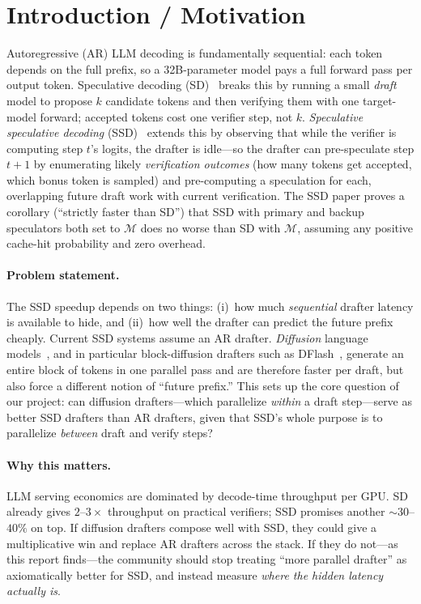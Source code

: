 \documentclass{article}
\begin{document}
\section{Introduction / Motivation}
\label{sec:intro}

Autoregressive (AR) LLM decoding is fundamentally sequential: each token depends on the full prefix, so a 32B-parameter model pays a full forward pass per output token.
Speculative decoding (SD)~\citep{leviathan2023specdec,chen2023specsampling} breaks this by running a small \emph{draft} model to propose $k$ candidate tokens and then verifying them with one target-model forward; accepted tokens cost one verifier step, not $k$.
\emph{Speculative speculative decoding} (SSD)~\citep{kumar2026ssd} extends this by observing that while the verifier is computing step $t$'s logits, the drafter is idle---so the drafter can pre-speculate step $t{+}1$ by enumerating likely \emph{verification outcomes} (how many tokens get accepted, which bonus token is sampled) and pre-computing a speculation for each, overlapping future draft work with current verification.
The SSD paper proves a corollary (``strictly faster than SD'') that SSD with primary and backup speculators both set to $\mathcal{M}$ does no worse than SD with $\mathcal{M}$, assuming any positive cache-hit probability and zero overhead.

\paragraph{Problem statement.}
The SSD speedup depends on two things: (i)~how much \emph{sequential} drafter latency is available to hide, and (ii)~how well the drafter can predict the future prefix cheaply.
Current SSD systems assume an AR drafter.
\emph{Diffusion} language models~\citep{arriola2024blockdiffusion}, and in particular block-diffusion drafters such as DFlash~\citep{dflash2025}, generate an entire block of tokens in one parallel pass and are therefore faster per draft, but also force a different notion of ``future prefix.''
This sets up the core question of our project: can diffusion drafters---which parallelize \emph{within} a draft step---serve as better SSD drafters than AR drafters, given that SSD's whole purpose is to parallelize \emph{between} draft and verify steps?

\paragraph{Why this matters.}
LLM serving economics are dominated by decode-time throughput per GPU.
SD already gives $2$--$3{\times}$ throughput on practical verifiers; SSD promises another ${\sim}30$--$40\%$ on top.
If diffusion drafters compose well with SSD, they could give a multiplicative win and replace AR drafters across the stack.
If they do not---as this report finds---the community should stop treating ``more parallel drafter'' as axiomatically better for SSD, and instead measure \emph{where the hidden latency actually is}.
\end{document}
